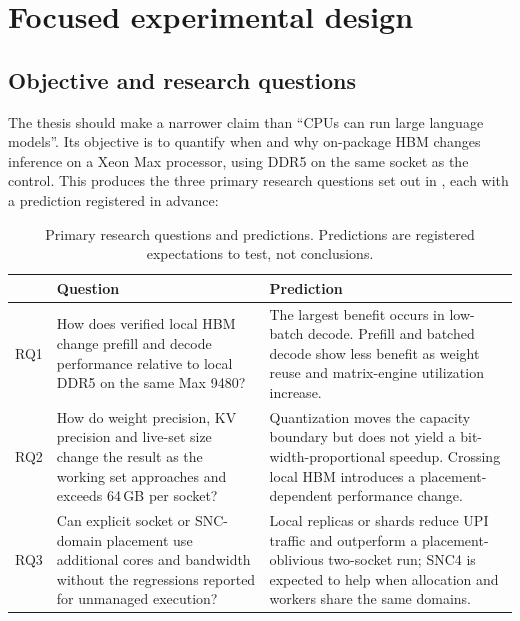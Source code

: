 
\section{Focused experimental design}
\label{sec:methodology}

\subsection{Objective and research questions}

The thesis should make a narrower claim than ``CPUs can run large
language models''.  Its objective is to quantify when and why
on-package HBM changes inference on a Xeon Max processor, using DDR5 on
the same socket as the control.  This produces the three primary
research questions set out in , each
with a prediction registered in advance:

\begin{table}[htbp]
\centering
\small
\tabsetup
\caption{Primary research questions and predictions.  Predictions are
registered expectations to test, not conclusions.}
\label{tab:research-questions}
\begin{tabularx}{\textwidth}{@{}lYY@{}}
\toprule
\headrow
 & \textbf{Question} & \textbf{Prediction} \\
\midrule
RQ1
 & How does verified local HBM change prefill and decode performance
   relative to local DDR5 on the same Max 9480?
 & The largest benefit occurs in low-batch decode.  Prefill and batched
   decode show less benefit as weight reuse and matrix-engine utilization
   increase. \\
RQ2
 & How do weight precision, KV precision and live-set size change the
   result as the working set approaches and exceeds 64\,GB per socket?
 & Quantization moves the capacity boundary but does not yield a
   bit-width-proportional speedup.  Crossing local HBM introduces a
   placement-dependent performance change. \\
RQ3
 & Can explicit socket or SNC-domain placement use additional cores and
   bandwidth without the regressions reported for unmanaged execution?
 & Local replicas or shards reduce UPI traffic and outperform a
   placement-oblivious two-socket run; SNC4 is expected to help when
   allocation and workers share the same domains. \\
\bottomrule
\end{tabularx}
\end{table}

